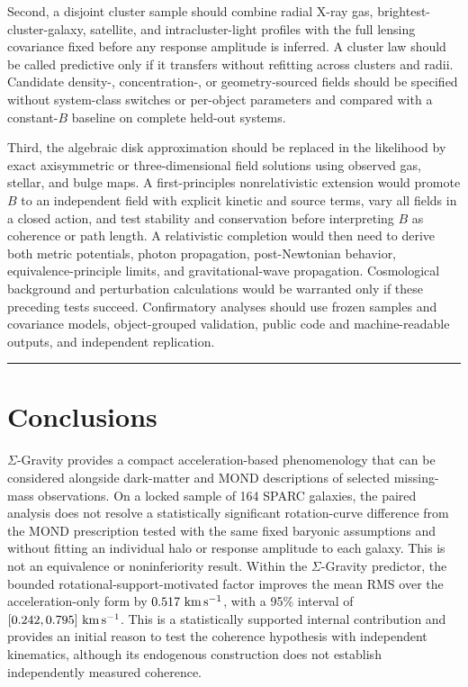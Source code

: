 \documentclass[aps,prd,reprint,superscriptaddress,showpacs,floatfix,longbibliography]{revtex4-2}
\begin{document}
Second, a disjoint cluster sample should combine radial X-ray gas, brightest-cluster-galaxy, satellite, and intracluster-light profiles with the full lensing covariance fixed before any response amplitude is inferred. A cluster law should be called predictive only if it transfers without refitting across clusters and radii. Candidate density-, concentration-, or geometry-sourced fields should be specified without system-class switches or per-object parameters and compared with a constant-$B$ baseline on complete held-out systems.

Third, the algebraic disk approximation should be replaced in the likelihood by exact axisymmetric or three-dimensional field solutions using observed gas, stellar, and bulge maps. A first-principles nonrelativistic extension would promote $B$ to an independent field with explicit kinetic and source terms, vary all fields in a closed action, and test stability and conservation before interpreting $B$ as coherence or path length. A relativistic completion would then need to derive both metric potentials, photon propagation, post-Newtonian behavior, equivalence-principle limits, and gravitational-wave propagation. Cosmological background and perturbation calculations would be warranted only if these preceding tests succeed. Confirmatory analyses should use frozen samples and covariance models, object-grouped validation, public code and machine-readable outputs, and independent replication.

\medskip\hrule\medskip

\section{Conclusions}

$\Sigma$-Gravity provides a compact acceleration-based phenomenology that can be considered alongside dark-matter and MOND descriptions of selected missing-mass observations. On a locked sample of 164 SPARC galaxies, the paired analysis does not resolve a statistically significant rotation-curve difference from the MOND prescription tested with the same fixed baryonic assumptions and without fitting an individual halo or response amplitude to each galaxy. This is not an equivalence or noninferiority result. Within the $\Sigma$-Gravity predictor, the bounded rotational-support-motivated factor improves the mean RMS over the acceleration-only form by $0.517\ {\rm km\,s^{-1}}$, with a 95\% interval of $[0.242,0.795]\ {\rm km\,s^{-1}}$. This is a statistically supported internal contribution and provides an initial reason to test the coherence hypothesis with independent kinematics, although its endogenous construction does not establish independently measured coherence.
\end{document}
